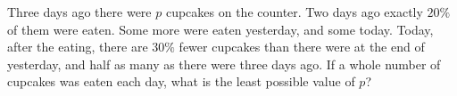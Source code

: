 Three days ago there were $p$ cupcakes on the counter. Two days ago exactly $20\%$ of them were eaten. Some more were eaten yesterday, and some today. Today, after the eating, there are $30\%$ fewer cupcakes than there were at the end of yesterday, and half as many as there were three days ago. If a whole number of cupcakes was eaten each day, what is the least possible value of $p$?
